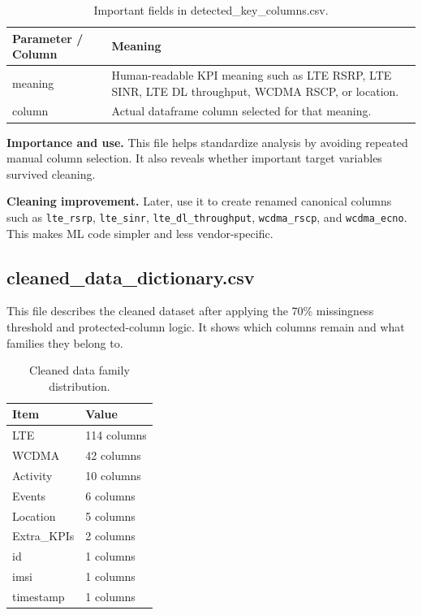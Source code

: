 \documentclass[12pt,a4paper]{article}
\begin{document}
\begin{table}[H]
\centering
\begin{tabularx}{\textwidth}{P{0.38\textwidth}Y}
\toprule
\textbf{Parameter / Column} & \textbf{Meaning} \\
\midrule
{\ttfamily meaning} & Human-readable KPI meaning such as LTE RSRP, LTE SINR, LTE DL throughput, WCDMA RSCP, or location. \\
{\ttfamily column} & Actual dataframe column selected for that meaning. \\
\bottomrule
\end{tabularx}
\caption{Important fields in detected\_key\_columns.csv.}
\end{table}


\textbf{Importance and use.} This file helps standardize analysis by avoiding repeated manual column selection. It also reveals whether important target variables survived cleaning.

\textbf{Cleaning improvement.} Later, use it to create renamed canonical columns such as \texttt{lte\_rsrp}, \texttt{lte\_sinr}, \texttt{lte\_dl\_throughput}, \texttt{wcdma\_rscp}, and \texttt{wcdma\_ecno}. This makes ML code simpler and less vendor-specific.


\subsection{cleaned\_data\_dictionary.csv}
This file describes the cleaned dataset after applying the 70\% missingness threshold and protected-column logic. It shows which columns remain and what families they belong to.


\begin{table}[H]
\centering
\begin{tabularx}{0.94\textwidth}{P{5.2cm}Y}
\toprule
\textbf{Item} & \textbf{Value} \\
\midrule
LTE & 114 columns \\
WCDMA & 42 columns \\
Activity & 10 columns \\
Events & 6 columns \\
Location & 5 columns \\
Extra\_KPIs & 2 columns \\
id & 1 columns \\
imsi & 1 columns \\
timestamp & 1 columns \\
\bottomrule
\end{tabularx}
\caption{Cleaned data family distribution.}
\end{table}
\end{document}
